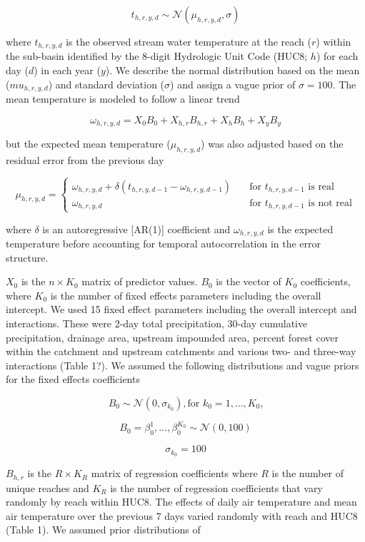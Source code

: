 \documentclass[]{article}
\begin{document}
\[ t_{h,r,y,d} \sim \mathcal{N}(\mu_{h,r,y,d}, \sigma) \]

where \(t_{h,r,y,d}\) is the observed stream water temperature at the
reach (\(r\)) within the sub-basin identified by the 8-digit Hydrologic
Unit Code (HUC8; \(h\)) for each day (\(d\)) in each year (\(y\)). We
describe the normal distribution based on the mean (\(mu_{h,r,y,d}\))
and standard deviation (\(\sigma\)) and assign a vague prior of
\(\sigma = 100\). The mean temperature is modeled to follow a linear
trend

\[ \omega_{h,r,y,d} = X_0 B_0 + X_{h,r} B_{h,r} + X_{h} B_{h} + X_{y} B_{y} \]

but the expected mean temperature (\(\mu_{h,r,y,d}\)) was also adjusted
based on the residual error from the previous day

\[ \mu_{h,r,y,d} = \begin{cases}
    \omega_{h,r,y,d} + \delta(t_{h,r,y,d-1} - \omega_{h,r,y,d-1}) & \quad  \text{for $t_{h,r,y,d-1}$ is real} \\
    \omega_{h,r,y,d} & \quad  \text{for $t_{h,r,y,d-1}$ is not real}
  \end{cases}
 \]

where \(\delta\) is an autoregressive {[}AR(1){]} coefficient and
\(\omega_{h,r,y,d}\) is the expected temperature before accounting for
temporal autocorrelation in the error structure.

\(X_{0}\) is the \(n \times K_0\) matrix of predictor values. \(B_0\) is
the vector of \(K_0\) coefficients, where \(K_0\) is the number of fixed
effects parameters including the overall intercept. We used 15 fixed
effect parameters including the overall intercept and interactions.
These were 2-day total precipitation, 30-day cumulative precipitation,
drainage area, upstream impounded area, percent forest cover within the
catchment and upstream catchments and various two- and three-way
interactions (Table 1?). We assumed the following distributions and
vague priors for the fixed effects coefficients

\[ B_0 \sim \mathcal{N}(0,\sigma_{k_0}), \text{for $k_0 = 1,...,K_0$,} \]

\[ B_0 = \beta_{0}^{1},...,\beta_{0}^{K_{0}} \sim \mathcal{N}(0, 100) \]

\[ \sigma_{k_0} = 100 \]

\(B_{h,r}\) is the \(R \times K_{R}\) matrix of regression coefficients
where \(R\) is the number of unique reaches and \(K_{R}\) is the number
of regression coefficients that vary randomly by reach within HUC8. The
effects of daily air temperature and mean air temperature over the
previous 7 days varied randomly with reach and HUC8 (Table 1). We
assumed prior distributions of
\end{document}
